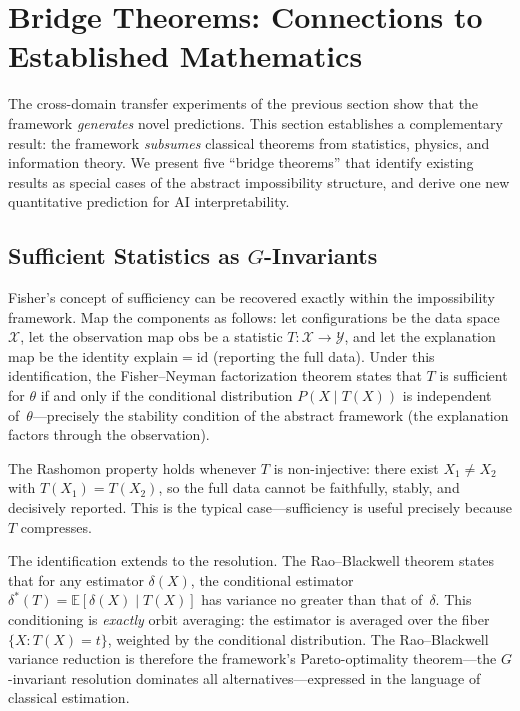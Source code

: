\documentclass[11pt,a4paper]{article}
\newcommand{\E}{\mathbb{E}}
\begin{document}
\section{Bridge Theorems: Connections to Established Mathematics}
\label{sec:bridge-theorems}

The cross-domain transfer experiments of the previous section show that the
framework \emph{generates} novel predictions.  This section establishes a
complementary result: the framework \emph{subsumes} classical theorems from
statistics, physics, and information theory.  We present five ``bridge
theorems'' that identify existing results as special cases of the abstract
impossibility structure, and derive one new quantitative prediction for AI
interpretability.

\subsection{Sufficient Statistics as $G$-Invariants}
\label{sec:bridge-sufficiency}

Fisher's concept of sufficiency \citep{fisher1922mathematical} can be
recovered exactly within the impossibility framework.  Map the components as
follows: let configurations be the data space~$\mathcal{X}$, let the
observation map $\mathrm{obs}$ be a statistic $T\colon \mathcal{X} \to
\mathcal{Y}$, and let the explanation map be the identity $\mathrm{explain} =
\mathrm{id}$ (reporting the full data).  Under this identification, the
Fisher--Neyman factorization theorem \citep{neyman1935su} states that $T$ is
sufficient for $\theta$ if and only if the conditional distribution
$P(X \mid T(X))$ is independent of~$\theta$---precisely the stability
condition of the abstract framework (the explanation factors through the
observation).

The Rashomon property holds whenever $T$ is non-injective: there exist
$X_1 \neq X_2$ with $T(X_1) = T(X_2)$, so the full data cannot be
faithfully, stably, and decisively reported.  This is the typical
case---sufficiency is useful precisely because $T$ compresses.

The identification extends to the resolution.  The Rao--Blackwell theorem
\citep{rao1945information, blackwell1947conditional} states that for any
estimator $\delta(X)$, the conditional estimator
$\delta^*(T) = \E[\delta(X) \mid T(X)]$ has variance no greater than that
of~$\delta$.  This conditioning is \emph{exactly} orbit averaging: the
estimator is averaged over the fiber $\{X : T(X) = t\}$, weighted by the
conditional distribution.  The Rao--Blackwell variance reduction is therefore
the framework's Pareto-optimality theorem---the $G$-invariant resolution
dominates all alternatives---expressed in the language of classical
estimation.
\end{document}
